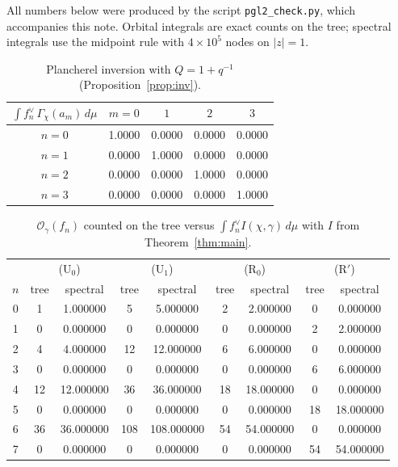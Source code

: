 \documentclass[11pt]{article}
\theoremstyle{remark}
\newcommand{\OO}{\mathcal{O}}
\begin{document}
All numbers below were produced by the script \texttt{pgl2\_check.py}, which accompanies this note. Orbital integrals are exact counts on the tree; spectral integrals use the midpoint rule with $4\times10^5$ nodes on $|z|=1$.

\begin{table}[h]
\centering
\begin{tabular}{c|cccc}
\toprule
$\int f_n^\vee\,\Gamma_\chi(a_m)\,d\mu$ & $m=0$ & $1$ & $2$ & $3$\\
\midrule
$n=0$ & 1.0000 & 0.0000 & 0.0000 & 0.0000\\
$n=1$ & 0.0000 & 1.0000 & 0.0000 & 0.0000\\
$n=2$ & 0.0000 & 0.0000 & 1.0000 & 0.0000\\
$n=3$ & 0.0000 & 0.0000 & 0.0000 & 1.0000\\
\bottomrule
\end{tabular}
\caption{Plancherel inversion with $Q=1+q^{-1}$ (Proposition~\ref{prop:inv}).}\label{tab:inv}
\end{table}

\begin{table}[h]
\centering
\begin{tabular}{c|cc|cc|cc|cc}
\toprule
& \multicolumn{2}{c|}{(U$_0$)} & \multicolumn{2}{c|}{(U$_1$)} & \multicolumn{2}{c|}{(R$_0$)} & \multicolumn{2}{c}{(R$'$)}\\
$n$ & tree & spectral & tree & spectral & tree & spectral & tree & spectral\\
\midrule
0 & 1 & 1.000000 & 5 & 5.000000 & 2 & 2.000000 & 0 & 0.000000\\
1 & 0 & 0.000000 & 0 & 0.000000 & 0 & 0.000000 & 2 & 2.000000\\
2 & 4 & 4.000000 & 12 & 12.000000 & 6 & 6.000000 & 0 & 0.000000\\
3 & 0 & 0.000000 & 0 & 0.000000 & 0 & 0.000000 & 6 & 6.000000\\
4 & 12 & 12.000000 & 36 & 36.000000 & 18 & 18.000000 & 0 & 0.000000\\
5 & 0 & 0.000000 & 0 & 0.000000 & 0 & 0.000000 & 18 & 18.000000\\
6 & 36 & 36.000000 & 108 & 108.000000 & 54 & 54.000000 & 0 & 0.000000\\
7 & 0 & 0.000000 & 0 & 0.000000 & 0 & 0.000000 & 54 & 54.000000\\
\bottomrule
\end{tabular}
\caption{$\OO_\gamma(f_n)$ counted on the tree versus $\int f_n^\vee I(\chi,\gamma)\,d\mu$ with $I$ from Theorem~\ref{thm:main}.}\label{tab:data}
\end{table}
\end{document}

